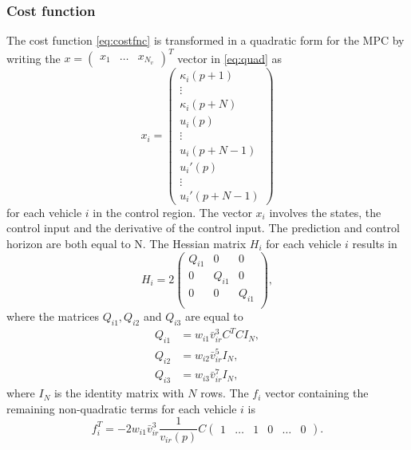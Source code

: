 \documentclass[letterpaper,10pt,conference]{ieeeconf}
\begin{document}
\subsubsection{Cost function}
The cost function \eqref{eq:costfnc} is transformed in a quadratic form for the MPC by writing the $x=\begin{pmatrix}x_1&\dots&x_{N_v}  \end{pmatrix}^T$ vector in \eqref{eq:quad} as
\begin{equation}
x_i=\begin{pmatrix}
\kappa_i(p+1)\\\vdots\\ \kappa_i(p+N)\\ u_i(p) \\ \vdots \\ u_i(p+N-1)\\ u_i'(p)\\ \vdots \\ u_i'(p+N-1) 
\end{pmatrix}
\end{equation}
for each vehicle $i$ in the control region. The vector $x_i$ involves the states, the control input and the derivative of the control input. The prediction and control horizon are both equal to N. The Hessian matrix $H_i$ for each vehicle $i$ results in
\begin{equation}\label{eq:hessian}
H_i = 2
\begin{pmatrix}
    Q_{i1} & 0 & 0 \\
    0 & Q_{i1} & 0 \\
    0 & 0 & Q_{i1} \\
\end{pmatrix},
\end{equation}
where the matrices $Q_{i1}, Q_{i2}$ and $Q_{i3}$ are equal to
\begin{subequations}
\begin{align}
Q_{i1} &= w_{i1}\bar{v}_{ir}^3 C^TC I_N, \\ 
Q_{i2} &=  w_{i2}\bar{v}_{ir}^5I_N ,\\
Q_{i3} &= w_{i3}\bar{v}_{ir}^7I_N,
\end{align}
\end{subequations}
where $I_N$ is the identity matrix with $N$ rows.
The $f_i$ vector containing the remaining non-quadratic terms for each vehicle $i$ is
\begin{equation}
f_i^T = -2w_{i1}\bar{v}_{ir}^3\frac{1}{v_{ir}(p)}C
\begin{pmatrix}
1 & \hdots & 1 & 0 & \hdots & 0
\end{pmatrix}\label{eq:fvec}.
\end{equation}
\end{document}
